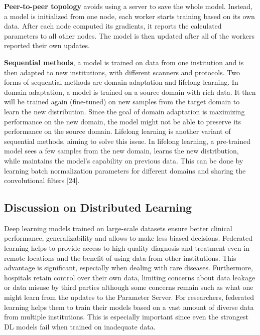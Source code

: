 \textbf{Peer-to-peer topology} avoids using a server to save the whole model. Instead, a model is initialized from one node, each worker starts training based on its own data. After each node computed its gradients, it reports the calculated parameters to all other nodes. The model is then updated after all of the workers reported their own updates.


\textbf{Sequential methods}, a model is trained on data from one institution and is then adapted to new institutions, with different scanners and protocols. Two forms of sequential methods are domain adaptation and lifelong learning. In domain adaptation, a model is trained on a source domain with rich data. It then will be trained again (fine-tuned) on new samples from the target domain to learn the new distribution. Since the goal of domain adaptation is maximizing performance on the new domain, the model might not be able to preserve its performance on the source domain. Lifelong learning is another variant of sequential methods, aiming to solve this issue. In lifelong learning, a pre-trained model sees a few samples from the new domain, learns the new distribution, while maintains the model’s capability on previous data. This can be done by learning batch normalization parameters for different domains and sharing the convolutional filters [24]. 

\subsection{Discussion on Distributed Learning}
Deep learning models trained on large-scale datasets ensure better clinical performance, generalizability and allows to make less biased decisions. Federated learning helps to provide access to high-quality diagnosis and treatment even in remote locations and the benefit of using data from other institutions. This advantage is significant, especially when dealing with rare diseases. Furthermore, hospitals retain control over their own data, limiting concerns about data leakage or data misuse by third parties although some concerns remain such as what one might learn from the updates to the Parameter Server. For researchers, federated learning helps them to train their models based on a vast amount of diverse data from multiple institutions. This is especially important since even the strongest DL models fail when trained on inadequate data.


